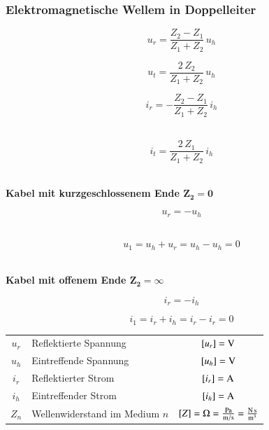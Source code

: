 \subsubsection{Elektromagnetische Wellem in Doppelleiter}

\begin{minipage}{0.48\linewidth}
$$ \boxed{ u_r = \frac{Z_2 - Z_1}{Z_1 + Z_2} \, u_h } $$
\end{minipage}
\hfill
\begin{minipage}{0.48\linewidth}
$$ \boxed{ u_t = \frac{2 \, Z_2}{Z_1 + Z_2} \, u_h } $$
\end{minipage}


\begin{minipage}{0.48\linewidth}
$$ \boxed{ i_r = -\frac{Z_2 - Z_1}{Z_1 + Z_2} \, i_h } $$ \\
\end{minipage}
\hfill
\begin{minipage}{0.48\linewidth}
$$ \boxed{ i_t = \frac{2 \, Z_1}{Z_1 + Z_2} \, i_h } $$ \\
\end{minipage}

\textbf{Kabel mit kurzgeschlossenem Ende $\boldsymbol{Z_2 = 0}$} \\
\vspace{0.2cm}
\begin{minipage}{0.3\linewidth}
$$ u_r = - u_h $$ \\
\end{minipage}
\hfill
\begin{minipage}{0.68\linewidth}
$$ u_1 = u_h + u_r  = u_h - u_h = 0 $$ \\
\end{minipage}
\vspace{-0.2cm}


\textbf{Kabel mit offenem Ende $\boldsymbol{Z_2 = \infty}$} \\
\vspace{0.2cm}
\begin{minipage}{0.3\linewidth}
$$ i_r = - i_h $$ 
\end{minipage}
\hfill
\begin{minipage}{0.68\linewidth}
$$ i_1 = i_r + i_h  = i_r - i_r = 0 $$  
\end{minipage}

\vspace{0.2cm}

\renewcommand{\arraystretch}{1.1}
\begin{tabular}{clc}
$u_r$ & Reflektierte Spannung & $[u_r] = \mathrm{V}$ \\
$u_h$ & Eintreffende Spannung & $[u_h] = \mathrm{V}$ \\
$i_r$ & Reflektierter Strom & $[i_r] = \mathrm{A}$ \\
$i_h$ & Eintreffender Strom & $[i_h] = \mathrm{A}$ \\
$Z_n$ & Wellenwiderstand im Medium $n$ & $[Z] = \mathrm{\Omega} = \frac{\mathrm{Pa}}{\mathrm{m} / \mathrm{s}} = \frac{\mathrm{N} \, \mathrm{s}}{\mathrm{m}^3}$ \\
\end{tabular}
\renewcommand{\arraystretch}{1}




